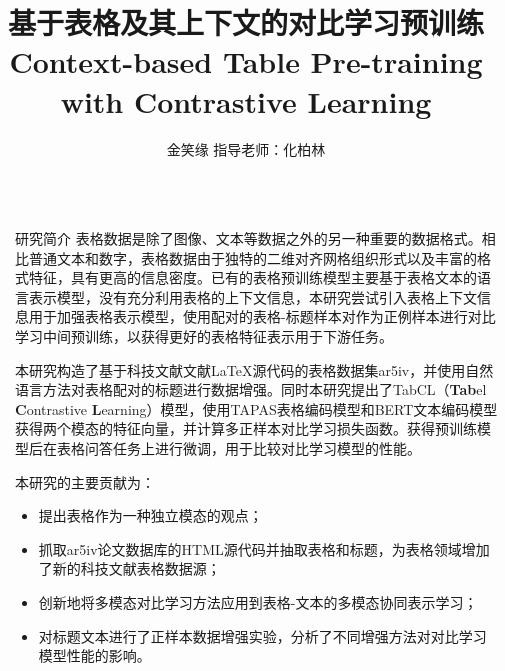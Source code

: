 \documentclass[final,hyperref={pdfpagelabels=false}]{ctexbeamer}
\title{基于表格及其上下文的对比学习预训练 \\\vspace{6mm} Context-based Table Pre-training with Contrastive Learning} %
\author{金笑缘 \quad 指导老师：化柏林}
\institute{北京大学信息管理系 \quad 大数据管理与应用专业}
\newcommand{\shrink}{-15pt}
\begin{document}

\begin{frame}[t] %

\begin{columns}[t] %

  \begin{column}{.02\textwidth}\end{column} %


  \begin{column}{.3\textwidth} %

    \vspace{\shrink}
    \begin{block}{研究简介}
      表格数据是除了图像、文本等数据之外的另一种重要的数据格式。相比普通文本和数字，表格数据由于独特的二维对齐网格组织形式以及丰富的格式特征，具有更高的信息密度。已有的表格预训练模型主要基于表格文本的语言表示模型，没有充分利用表格的上下文信息，本研究尝试引入表格上下文信息用于加强表格表示模型，使用配对的表格-标题样本对作为正例样本进行对比学习中间预训练，以获得更好的表格特征表示用于下游任务。

      \vspace{4mm}
      本研究构造了基于科技文献文献LaTeX源代码的表格数据集ar5iv，并使用自然语言方法对表格配对的标题进行数据增强。同时本研究提出了TabCL（\textbf{Tab}el \textbf{C}ontrastive \textbf{L}earning）模型，使用TAPAS表格编码模型和BERT文本编码模型获得两个模态的特征向量，并计算多正样本对比学习损失函数。获得预训练模型后在表格问答任务上进行微调，用于比较对比学习模型的性能。
      
      \vspace{4mm}
      本研究的主要贡献为：
      \vspace{4mm}
      \begin{itemize}
          \item 提出表格作为一种独立模态的观点；
          \item 抓取ar5iv论文数据库的HTML源代码并抽取表格和标题，为表格领域增加了新的科技文献表格数据源；
          \item 创新地将多模态对比学习方法应用到表格-文本的多模态协同表示学习；
          \item 对标题文本进行了正样本数据增强实验，分析了不同增强方法对对比学习模型性能的影响。
      \end{itemize}


\end{block}
\end{column}
\end{columns}
\end{frame}
\end{document}
